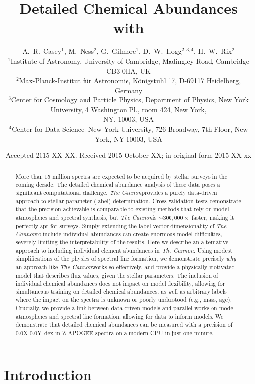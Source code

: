 \documentclass[useAMS,usenatbib]{mn2e}
\title[Cannon Chemistry]{Detailed Chemical Abundances with \tc}
\author[Casey et al.]{A.~R.~Casey$^1$, M.~Ness$^2$, G.~Gilmore$^1$,
    D.~W.~Hogg$^{2,3,4}$, H.~W.~Rix$^2$ \\ 
$^1$Institute of Astronomy, University of Cambridge, Madingley Road, Cambridge
    CB3 0HA, UK\\
$^2$Max-Planck-Institut f\"ur Astronomie, K\"onigstuhl 17, D-69117 Heidelberg,
    Germany\\
$^3$Center for Cosmology and Particle Physics, Department of Physics, New York
    University, 4 Washington Pl., room 424, New York, \\
    NY, 10003, USA\\
$^4$Center for Data Science, New York University, 726 Broadway, 7th Floor,
    New York, NY 10003, USA}
\newcommand\tc{\textit{The Cannon}}
\begin{document}
\date{Accepted 2015 XX XX. Received 2015 October XX; in original form 2015 XX xx}

\pagerange{\pageref{firstpage}--\pageref{lastpage}} 

\maketitle

\label{firstpage}

\begin{abstract}
More than 15 million spectra are expected to be acquired by stellar surveys in
the coming decade. The detailed chemical abundance analysis of these data poses
a significant computational challenge. \tc provides a purely data-driven
approach to stellar parameter (label) determination. Cross-validation tests
demonstrate that the precision achievable is comparable to existing methods that
rely on model atmospheres and spectral synthesis, but \tc is $\sim300,000\times$ faster, making it perfectly apt for surveys. Simply extending the label vector
dimensionality of \tc to include individual abundances can create enormous
model difficulties, severely limiting the interpretability of the results. Here
we describe an alternative approach to including individual element abundances
in \tc. Using modest simplifications of the physics of spectral line formation,
we demonstrate precisely \textit{why} an approach like \tc works so effectively,
and provide a physically-motivated model that describes flux values, given the
stellar parameters. The inclusion of individual chemical abundances does not
impact on model flexibility, allowing for simultaneous training on detailed
chemical abundances, as well as arbitrary labels where the impact on the spectra
is unknown or poorly understood (e.g., mass, age). Crucially, we provide a link
between data-driven models and parallel works on model atmospheres and spectral
line formation, allowing for data to inform models. We demonstrate that
detailed chemical abundances can be measured with a precision of 0.0X-0.0Y~dex
in Z APOGEE spectra on a modern CPU in just one minute.
\end{abstract}

\begin{keywords}
\end{keywords}

\section{Introduction}
\end{document}

